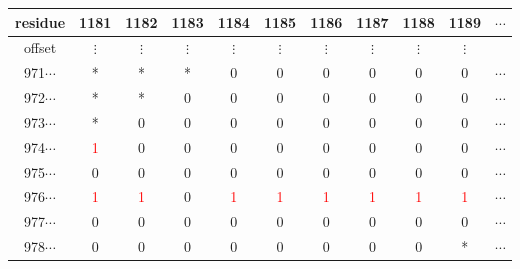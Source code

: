 \documentclass[phd,tocprelim]{cornell}
\begin{document}
\begin{table}[htp]
    
    \label{VRtab2}
\begin{center}
{\small
\begin{tabular}{|ccccccccccc|}                                                                                                     
\hline                                                                                                                                      
\scriptsize{residue} & \small{1181} &  \small{1182} &  \small{1183} &  \small{1184} &  \small{1185} &  \small{1186} &  \small{1187} &  \small{1188} &  \small{1189} & \small{}$\cdots$ \\                                                                                             
\hline                                                                                                                                                                                                      
\scriptsize{offset} & $\vdots$ &  $\vdots$ &  $\vdots$ & $\vdots$ &  $\vdots$ &  $\vdots$ & $\vdots$ &  $\vdots$ &  $\vdots$ & \\                                                                                                                                                                          
\small{971}$\cdots$ & * & * & * & 0 & 0 & 0 & 0 & 0 & 0 & $\cdots$ \\                                                                                  
\small{972}$\cdots$ & * & * & 0 & 0 & 0 & 0 & 0 & 0 & 0 & $\cdots$ \\                                                                                  
\small{973}$\cdots$ & * & 0 & 0 & 0 & 0 & 0 & 0 & 0 & 0 & $\cdots$ \\                                                                                  
\small{974}$\cdots$ & \textcolor{red}{1} & 0 & 0 & 0 & 0 & 0 & 0 & 0 & 0 & $\cdots$ \\                                                                 
\small{975}$\cdots$ & 0 & 0 & 0 & 0 & 0 & 0 & 0 & 0 & 0 & $\cdots$ \\
\small{976}$\cdots$ & \textcolor{red}{1} & \textcolor{red}{1} & 0 & \textcolor{red}{1} & \textcolor{red}{1} & \textcolor{red}{1} & \textcolor{red}{1} & \textcolor{red}{1} & \textcolor{red}{1} &  $\cdots$ \\
\small{977}$\cdots$ & 0 & 0 & 0 & 0 & 0 & 0 & 0 & 0 & 0 & $\cdots$ \\
\small{978}$\cdots$ & 0 & 0 & 0 & 0 & 0 & 0 & 0 & 0 & * & $\cdots$ \\

\end{tabular}}
\end{center}
\end{table}
\end{document}
